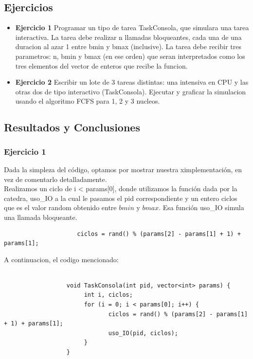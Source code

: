 
\subsection{Ejercicios}
\begin{itemize}
 \item \textbf{Ejercicio 1 } Programar un tipo de tarea TaskConsola, que simulara una tarea interactiva.
La tarea debe realizar n llamadas bloqueantes, cada una de una duracion al azar 1 entre bmin
y bmax (inclusive). La tarea debe recibir tres parametros: n, bmin y bmax (en ese orden) que
seran interpretados como los tres elementos del vector de enteros que recibe la funcion.
\item \textbf{Ejercicio 2} Escribir un lote de 3 tareas distintas: una intensiva en CPU y las otras dos de
tipo interactivo (TaskConsola). Ejecutar y graficar la simulacion usando el algoritmo FCFS
para 1, 2 y 3 nucleos.
\end{itemize}

\subsection{Resultados y Conclusiones}

\subsubsection[Resolución Ejercicio 1]{Ejercicio 1}

\indent Dada la simpleza del código, optamos por mostrar nuestra ximplementación, en vez de comentarlo detalladamente.\\
\indent Realizamos un ciclo de i < params[0], donde utilizamos la función dada por la catedra, uso\_IO a la cual le pasamos
el pid correspondiente y un entero ciclos que es el valor random obtenido entre $bmin$ y $bmax$. Esa función uso\_IO simula una llamada bloqueante.
\begin{center}
 \begin{verbatim}
                     ciclos = rand() % (params[2] - params[1] + 1) + params[1];
 \end{verbatim}

\end{center}

\indent A continuacion, el codigo mencionado:

\begin{verbatim}

                  void TaskConsola(int pid, vector<int> params) {
                       int i, ciclos;              
                       for (i = 0; i < params[0]; i++) {
                              ciclos = rand() % (params[2] - params[1] + 1) + params[1];  
                              uso_IO(pid, ciclos);
                       }
                  } 

\end{verbatim}

